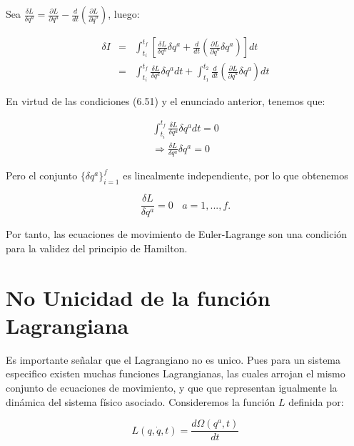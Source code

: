 \documentclass[12pt]{report}
\begin{document}
Sea $\displaystyle \frac{\delta L}{\delta q^a}=\frac{\partial L}{\partial q^a}-\frac{d}{dt}\left( \frac{\partial L}{\partial \dot{q}^a} \right)$, luego:

\begin{eqnarray}
\delta I &=& \int_{t_i}^{t_f} \left[ \frac{\delta L}{\delta q^a} \delta q^a + \frac{d}{dt} \left( \frac{\partial L}{\partial \dot{q}^a}\delta q^a \right) \right] dt \\
&=&\int_{t_i}^{t_f}  \frac{\delta L}{\delta q^a} \delta q^a dt + \int_{t_1}^{t_2} \frac{d}{dt} \left( \frac{\partial L}{\partial \dot{q}^a}\delta q^a \right)  dt 
\end{eqnarray}

En virtud de las condiciones (6.51) y el enunciado anterior, tenemos que:

\begin{eqnarray}
\int_{t_i}^{t_f} \frac{\delta L}{\delta q^a} \delta q^a dt = 0 \\
\Rightarrow \frac{\delta L}{\delta q^a}\delta q^a =0
\end{eqnarray}

Pero el conjunto $\displaystyle\{ \delta q^a \}_{i=1}^f$ es linealmente independiente, por lo que obtenemos

\begin{equation}
\frac{\delta L}{\delta q^a}=0 \ \ \ \ a=1,...,f.
\end{equation}


Por tanto, las ecuaciones de movimiento de Euler-Lagrange son una condición para la validez del principio de Hamilton.













\section{No Unicidad de la función Lagrangiana}

Es importante señalar que el Lagrangiano no es unico. Pues para un sistema especifico existen muchas funciones Lagrangianas, las cuales arrojan el mismo conjunto de ecuaciones de movimiento, y que que representan igualmente la dinámica del sistema físico asociado. Consideremos la función $L$ definida por:

\begin{equation}
L\left(q,\dot{q},t\right)= \frac{d\Omega(q^a,t)}{dt}
\end{equation}
\end{document}
